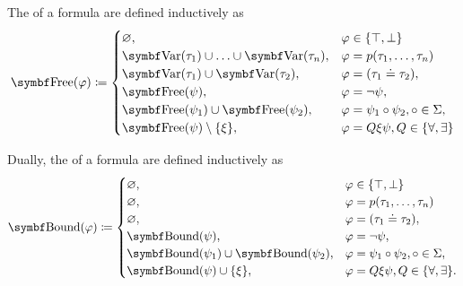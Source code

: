 \begin{definition}
\begin{DefEnum}
     The  of a formula are defined inductively as
    \begin{equation}\label{eq:def:first_order_language/formula_free_variables}
      \Bold{Free}(\varphi) \coloneqq \begin{cases}
        \varnothing,                                            &\varphi \in \{ \top, \bot \} \\
        \Bold{Var}(\tau_1) \cup \ldots \cup \Bold{Var}(\tau_n), &\varphi = p(\tau_1, \ldots, \tau_n) \\
        \Bold{Var}(\tau_1) \cup \Bold{Var}(\tau_2),             &\varphi = (\tau_1 \doteq \tau_2), \\
        \Bold{Free}(\psi),                                      &\varphi = \neg \psi, \\
        \Bold{Free}(\psi_1) \cup \Bold{Free}(\psi_2),           &\varphi = \psi_1 \circ \psi_2, \circ \in \Sigma, \\
        \Bold{Free}(\psi) \setminus \{ \xi \},                  &\varphi = Q \xi \psi, Q \in \{ \forall, \exists \}
      \end{cases}
    \end{equation}

     Dually, the  of a formula are defined inductively as
    \begin{equation}\label{eq:def:first_order_language/formula_bound_variables}
      \Cat{Bound}(\varphi) \coloneqq \begin{cases}
        \varnothing,                                   &\varphi \in \{ \top, \bot \} \\
        \varnothing,                                   &\varphi = p(\tau_1, \ldots, \tau_n) \\
        \varnothing,                                   &\varphi = (\tau_1 \doteq \tau_2), \\
        \Cat{Bound}(\psi),                             &\varphi = \neg \psi, \\
        \Cat{Bound}(\psi_1) \cup \Bold{Bound}(\psi_2), &\varphi = \psi_1 \circ \psi_2, \circ \in \Sigma, \\
        \Cat{Bound}(\psi) \cup \{ \xi \},              &\varphi = Q \xi \psi, Q \in \{ \forall, \exists \}.
      \end{cases}
    \end{equation}
  \end{DefEnum}
\end{definition}

